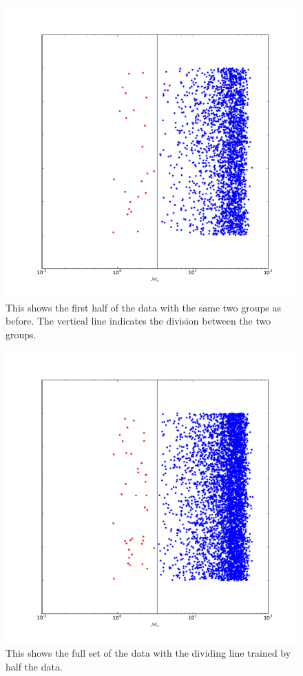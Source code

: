 \documentclass[12pt]{article}
\begin{document}
\begin{figure}
\includegraphics[width=\columnwidth]{output/jake/classifier_half.pdf}
\caption{This shows the first half of the data with the same two groups as before. The vertical line indicates the division between the two groups.}
\label{fig:half}
\end{figure}
\begin{figure}
\includegraphics[width=\columnwidth]{output/jake/classifier_all.pdf}
\caption{This shows the full set of the data with the dividing line trained by half the data.}
\label{fig:all}
\end{figure}
\end{document}
